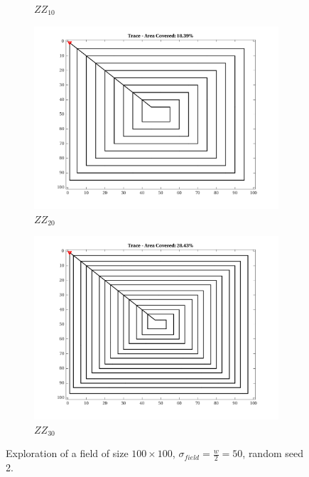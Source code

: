 \begin{figure}[htb!]
\begin{subfigure}[t]{0.3333\textwidth}
        \captionsetup{skip=0.20\baselineskip,size=footnotesize}
        \caption{$ZZ_{10}$}
    \end{subfigure}%
    \begin{subfigure}[t]{0.3333\textwidth}
        \centering
        \includegraphics[width=\linewidth]{figures/hbresults/path_zz_20p_100x100_sf_50_seed_2.png}
        \captionsetup{skip=0.20\baselineskip,size=footnotesize}
        \caption{$ZZ_{20}$}
    \end{subfigure}%
    \begin{subfigure}[t]{0.3333\textwidth}
        \centering
        \includegraphics[width=\linewidth]{figures/hbresults/path_zz_30p_100x100_sf_50_seed_2.png}
        \captionsetup{skip=0.20\baselineskip,size=footnotesize}
        \caption{$ZZ_{30}$}
    \end{subfigure}%
    \captionsetup{skip=0.20\baselineskip}
    \caption{Exploration of a field of size $100 \times 100$, $\sigma_{field} = \frac{w}{2} = 50$, random seed 2.}
    \label{fig:sf50}
\end{figure}


